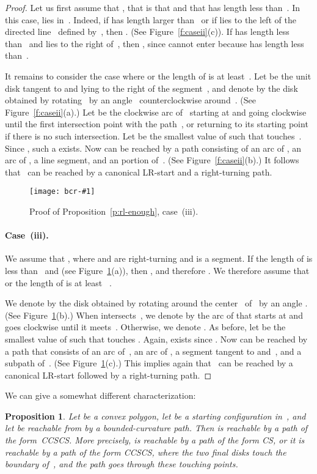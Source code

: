 \documentclass[a4paper]{article}
\newtheorem{prop}[theorem]{Proposition}
\newcommand{\epsfigure}[2]{
  \begin{figure}[htb]
    \centerline{\texttt{[image: bcr-\#1]}}
    \caption{#2}
    \label{f:#1}
  \end{figure}}
\begin{document}
\begin{proof}
  Let us first assume that , that is that  and that  has length less than~.  In this case,
   lies in~.  Indeed, if  has length larger
  than~ or if  lies to the left of the directed line~
  defined by~, then . (See
  Figure~\ref{f:caseii}(c)). If  has length less than~ and
   lies to the right of~, then , since
   cannot enter  because  has length less
  than~.

  It remains to consider the case where  or the length of
   is at least~. Let  be the unit disk tangent to
   and lying to the right of the segment~, and
  denote by  the disk obtained by rotating~ by an
  angle~ counterclockwise around~.  (See
    Figure~\ref{f:caseii}(a).) Let  be the clockwise arc
    of~ starting at  and going clockwise
    until the first intersection point with the path~, or
    returning to its starting point if there is no such intersection.
    Let  be the smallest value of 
      such that  touches~. Since , such a  exists.  Now
       can be reached by a path consisting of an arc of
      , an arc of , a line segment, and
      an portion of~. (See Figure~\ref{f:caseii}(b).)  It follows
      that ~can be reached by a canonical LR-start and a
      right-turning path.

\epsfigure{caseiii}{Proof of Proposition~\ref{p:rl-enough},
  case~(iii).}
\paragraph{Case~(iii).} We assume that ,
  where  and  are right-turning and  is a segment.  If
  the length of  is less than~ and  (see
  Figure~\ref{f:caseiii}(a)), then , and
  therefore .  We therefore assume that 
  or the length of  is at least~ .

  We denote by  the disk obtained by rotating
   around the center~ of~ by an
  angle . (See Figure~\ref{f:caseiii}(b).) When
     intersects~, we denote by  the arc
    of  that starts at  and
    goes clockwise until it meets~. Otherwise, we denote
    .  As before, let  be the
    smallest value of  such that 
      touches . Again,  exists since .  Now  can be reached by
      a path that consists of an arc of~, an arc of
      , a segment tangent to 
      and~, and a subpath of~. (See
      Figure~\ref{f:caseiii}(c).)  This implies again that~ can be
      reached by a canonical LR-start followed by a right-turning
      path. 
\end{proof}

We can give a somewhat different characterization:
\begin{prop} 
  Let  be a convex polygon, let  be a starting configuration
  in~, and let  be reachable from  by a
  bounded-curvature path. Then  is reachable by a path of the
  form~CCSCS. More precisely,  is reachable by a path of the form
  CS, or it is reachable by a path of the form CCSCS, where the two
  final disks touch the boundary of~, and the path goes through
  these touching points.
\end{prop}
\end{document}
